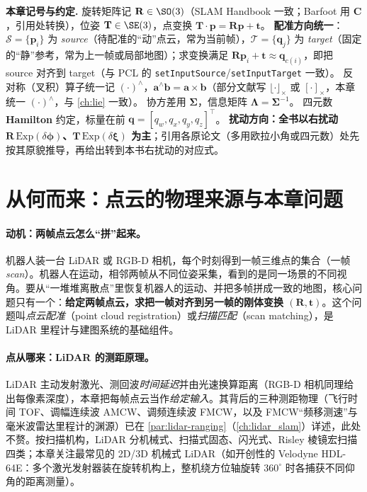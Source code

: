 \begin{note}
\textbf{本章记号与约定.}\;
旋转矩阵记 $\mathbf{R}\in\SO(3)$（SLAM Handbook\cite{carlone2026handbook} 一致；Barfoot\cite{barfoot2024state} 用 $\mathbf{C}$，引用处转换），位姿 $\mathbf{T}\in\SE(3)$，点变换 $\mathbf{T}\!\cdot\!\mathbf{p}=\mathbf{R}\mathbf{p}+\mathbf{t}$。
\textbf{配准方向统一}：$\mathcal{S}=\{\mathbf{p}_i\}$ 为 \emph{source}（待配准的“动”点云，常为当前帧），$\mathcal{T}=\{\mathbf{q}_j\}$ 为 \emph{target}（固定的“静”参考，常为上一帧或局部地图）；求变换满足 $\mathbf{R}\mathbf{p}_i+\mathbf{t}\approx\mathbf{q}_{c(i)}$，即把 source 对齐到 target（与 PCL 的 \texttt{setInputSource}/\texttt{setInputTarget} 一致）。
反对称（叉积）算子统一记 $(\cdot)^\wedge$，$\mathbf{a}^\wedge\mathbf{b}=\mathbf{a}\times\mathbf{b}$（部分文献写 $\lfloor\cdot\rfloor_\times$ 或 $[\cdot]_\times$，本章统一 $(\cdot)^\wedge$，与 \cref{ch:lie} 一致）。
协方差用 $\boldsymbol{\Sigma}$，信息矩阵 $\boldsymbol{\Lambda}=\boldsymbol{\Sigma}^{-1}$。
四元数 \textbf{Hamilton} 约定，标量在前 $\mathbf{q}=[q_w,q_x,q_y,q_z]^\top$。
\textbf{扰动方向：全书以右扰动 $\mathbf{R}\,\mathrm{Exp}(\delta\boldsymbol{\phi})$、$\mathbf{T}\,\mathrm{Exp}(\delta\boldsymbol{\xi})$ 为主}；引用各原论文（多用欧拉小角或四元数）处先按其原貌推导，再给出转到本书右扰动的对应式。
\end{note}

\section{从何而来：点云的物理来源与本章问题}
\label{sec:pc-why}

\paragraph{动机：两帧点云怎么“拼”起来。}
机器人装一台 LiDAR 或 RGB-D 相机，每个时刻得到一帧三维点的集合（一帧 \emph{scan}）。机器人在运动，相邻两帧从不同位姿采集，看到的是同一场景的不同视角。要从“一堆堆离散点”里恢复机器人的运动、并把多帧拼成一致的地图，核心问题只有一个：\textbf{给定两帧点云，求把一帧对齐到另一帧的刚体变换 $(\mathbf{R},\mathbf{t})$}。这个问题叫\emph{点云配准}（point cloud registration）或\emph{扫描匹配}（scan matching），是 LiDAR 里程计与建图系统的基础组件\cite{carlone2026handbook}。

\paragraph{点从哪来：LiDAR 的测距原理。}
LiDAR 主动发射激光、测回波\emph{时间延迟}并由光速换算距离（RGB-D 相机同理给出每像素深度），本章把每帧点云当作\emph{给定输入}。其背后的三种测距物理（飞行时间 TOF、调幅连续波 AMCW、调频连续波 FMCW，以及 FMCW“频移测速”与毫米波雷达里程计的渊源）已在 \cref{par:lidar-ranging}（\cref{ch:lidar_slam}）详述，此处不赘。按扫描机构，LiDAR 分机械式、扫描式固态、闪光式、Risley 棱镜宏扫描四类；本章关注最常见的 2D/3D 机械式 LiDAR（如开创性的 Velodyne HDL-64E：多个激光发射器装在旋转机构上，整机绕方位轴旋转 $360^\circ$ 时各捕获不同仰角的距离测量）。

